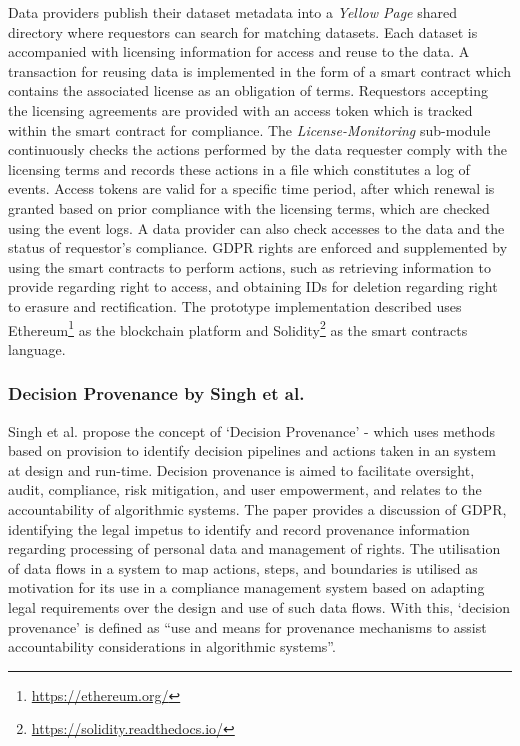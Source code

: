 Data providers publish their dataset metadata into a \textit{Yellow Page} shared directory where requestors can search for matching datasets. Each dataset is accompanied with licensing information for access and reuse to the data. A transaction for reusing data is implemented in the form of a smart contract which contains the associated license as an obligation of terms. Requestors accepting the licensing agreements are provided with an access token which is tracked within the smart contract for compliance. The \textit{License-Monitoring} sub-module continuously checks the actions performed by the data requester comply with the licensing terms and records these actions in a file which constitutes a log of events. Access tokens are valid for a specific time period, after which renewal is granted based on prior compliance with the licensing terms, which are checked using the event logs. A data provider can also check accesses to the data and the status of requestor's compliance. GDPR rights are enforced and supplemented by using the smart contracts to perform actions, such as retrieving information to provide regarding right to access, and obtaining IDs for deletion regarding right to erasure and rectification. The prototype implementation described uses Ethereum\footnote{\url{https://ethereum.org/}} as the blockchain platform and Solidity\footnote{\url{https://solidity.readthedocs.io/}} as the smart contracts language.

\subsubsection{Decision Provenance by Singh et al.}
Singh et al. propose the concept of `Decision Provenance' - which uses methods based on provision to identify decision pipelines and actions taken in an system at design and run-time. 
Decision provenance is aimed to facilitate oversight, audit, compliance, risk mitigation, and user empowerment, and relates to the accountability of algorithmic systems.
The paper provides a discussion of GDPR, identifying the legal impetus to identify and record provenance information regarding processing of personal data and management of rights. 
The utilisation of data flows in a system to map actions, steps, and boundaries is utilised as motivation for its use in a compliance management system based on adapting legal requirements over the design and use of such data flows. With this, `decision provenance' is defined as ``use and means for provenance mechanisms to assist accountability considerations in algorithmic systems''.

